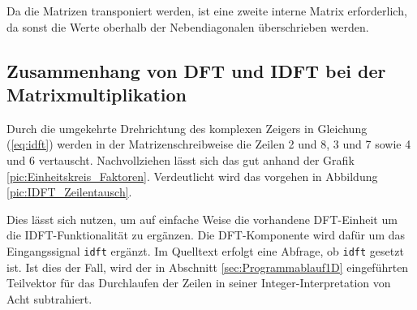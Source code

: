 Da die Matrizen transponiert werden, ist eine zweite interne Matrix erforderlich, da sonst die Werte oberhalb der
Nebendiagonalen überschrieben werden.

% 
% 
% 
% 


\subsection{Zusammenhang von DFT und IDFT bei der Matrixmultiplikation}

Durch die umgekehrte Drehrichtung des komplexen Zeigers in Gleichung (\ref{eq:idft}) werden in der Matrizenschreibweise die Zeilen 2 und 8, 3 und 7 sowie 4 und 6 vertauscht.
Nachvollziehen lässt sich das gut anhand der Grafik \ref{pic:Einheitskreis_Faktoren}. 
Verdeutlicht wird das vorgehen in Abbildung \ref{pic:IDFT_Zeilentausch}.

Dies lässt sich nutzen, um auf einfache Weise die vorhandene DFT-Einheit um die IDFT-Funktionalität zu ergänzen. 
Die DFT-Komponente wird dafür um das Eingangssignal \texttt{idft} ergänzt. Im Quelltext erfolgt eine Abfrage, ob \texttt{idft} gesetzt ist. Ist dies der Fall, wird der 
in Abschnitt \ref{sec:Programmablauf1D} eingeführten Teilvektor für das Durchlaufen der Zeilen in seiner Integer-Interpretation von Acht subtrahiert.

